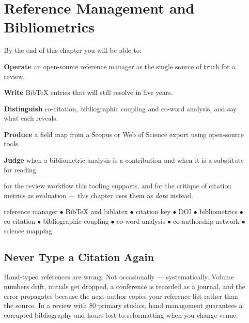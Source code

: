 \chapter{Reference Management and Bibliometrics}\label{ch:bibliometrics}

\begin{outcomes}
By the end of this chapter you will be able to:
\begin{tight}
  \item \textbf{Operate} an open-source reference manager as the single source
    of truth for a review.
  \item \textbf{Write} BibTeX entries that will still resolve in five years.
  \item \textbf{Distinguish} co-citation, bibliographic coupling and co-word
    analysis, and say what each reveals.
  \item \textbf{Produce} a field map from a Scopus or Web of Science export
    using open-source tools.
  \item \textbf{Judge} when a bibliometric analysis is a contribution and when
    it is a substitute for reading.
\end{tight}
\end{outcomes}

\begin{prereq}
 for the review workflow this tooling supports, and 
for the critique of citation metrics as evaluation --- this chapter uses them
as \emph{data} instead.
\end{prereq}

\begin{keyterms}
reference manager $\bullet$ BibTeX and biblatex $\bullet$ citation key
$\bullet$ DOI $\bullet$ bibliometrics $\bullet$ co-citation $\bullet$
bibliographic coupling $\bullet$ co-word analysis $\bullet$ co-authorship
network $\bullet$ science mapping
\end{keyterms}

\section{Never Type a Citation Again}

Hand-typed references are wrong. Not occasionally --- systematically. Volume
numbers drift, initials get dropped, a conference is recorded as a journal, and
the error propagates because the next author copies your reference list rather
than the source. In a review with 80 primary studies, hand management
guarantees a corrupted bibliography and hours lost to reformatting when you
change venue.

